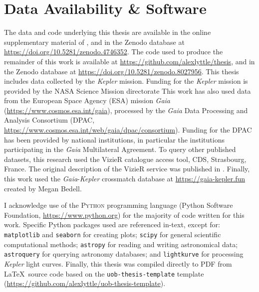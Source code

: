 \chapter*{Data Availability \& Software}

The data and code underlying this thesis are available in the online supplementary material of \citet{Lyttle.Davies.ea2021}, and in the Zenodo database at \url{https://doi.org/10.5281/zenodo.4746352}. The code used to produce the remainder of this work is available at \url{https://github.com/alexlyttle/thesis}, and in the Zenodo database at \url{https://doi.org/10.5281/zenodo.8027956}. This thesis includes data collected by the \emph{Kepler} mission. Funding for the \emph{Kepler} mission is provided by the NASA Science Mission directorate This work has also used data from the European Space Agency (ESA) mission
\emph{Gaia} (\url{https://www.cosmos.esa.int/gaia}), processed by the {\it Gaia}
Data Processing and Analysis Consortium (DPAC,
\url{https://www.cosmos.esa.int/web/gaia/dpac/consortium}). Funding for the DPAC
has been provided by national institutions, in particular the institutions
participating in the \emph{Gaia} Multilateral Agreement. To query other published datasets, this research used the VizieR catalogue access tool, CDS, Strasbourg, France. The original description of the VizieR service was published in \citet{Ochsenbein.Bauer.ea2000}. Finally, this work used the \emph{Gaia}-\emph{Kepler} crossmatch database at \url{https://gaia-kepler.fun} created by Megan Bedell.

I acknowledge use of the \textsc{Python} programming language (Python Software Foundation, \url{https://www.python.org}) for the majority of code written for this work. Specific Python packages used are referenced in-text, except for: \texttt{matplotlib} \citep[v3.6.2;][]{Caswell.Lee.ea2022,Hunter2007} and \texttt{seaborn} \citep{Waskom2021} for creating plots; \texttt{scipy} \citep{Virtanen.Gommers.ea2020} for general scientific computational methods; \texttt{astropy} \citep{AstropyCollaboration.Price-Whelan.ea2022} for reading and writing astronomical data; \texttt{astroquery} \citep{Ginsburg.Sipocz.ea2019} for querying astronomy databases; and \texttt{lightkurve} \citep{LightkurveCollaboration.Cardoso.ea2018} for processing \emph{Kepler} light curves. Finally, this thesis was compiled directly to PDF from \LaTeX~source code based on the \texttt{uob-thesis-template} template (\url{https://github.com/alexlyttle/uob-thesis-template}).
